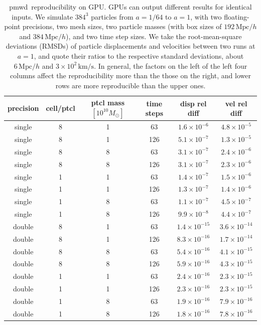\documentclass[modern, dvipsnames]{aastex631}
\newcommand{\pmwd}{{\usefont{T1}{nova}{m}{sl}pmwd}}
\newcommand{\Mpc}{\mathrm{Mpc}}
\begin{document}
\begin{table}[t]
\centering
\caption{\pmwd\ reproducibility on GPU.
GPUs can output different results for identical inputs.
We simulate $384^3$ particles from $a=1/64$ to $a=1$, with two
floating-point precisions, two mesh sizes, two particle masses (with box
sizes of $192 \, \Mpc / h$ and $384 \, \Mpc / h$), and two time step
sizes.
We take the root-mean-square deviations (RMSDs) of particle
displacements and velocities between two runs at $a=1$, and quote their
ratios to the respective standard deviations, about $6 \, \Mpc / h$ and
$3\times10^2 \, \mathrm{km} / \mathrm{s}$.
In general, the factors on the left of the left four columns affect the
reproducibility more than the those on the right, and lower rows are
more reproducible than the upper ones.
}
\label{tab:rep}
\begin{tabular}{cccccc}
  \toprule
  precision & cell/ptcl & ptcl mass $[10^{10} M_\odot]$ & time steps
    & disp rel diff & vel rel diff \\
  \midrule
  single & 8 & 1 &  63 & $1.6\times10^{-6}$  & $4.8\times10^{-5}$  \\
  single & 8 & 1 & 126 & $5.1\times10^{-7}$  & $1.3\times10^{-5}$  \\
  single & 8 & 8 &  63 & $3.1\times10^{-7}$  & $2.4\times10^{-6}$  \\
  single & 8 & 8 & 126 & $3.1\times10^{-7}$  & $2.3\times10^{-6}$  \\
  single & 1 & 1 &  63 & $1.4\times10^{-7}$  & $1.5\times10^{-6}$  \\
  single & 1 & 1 & 126 & $1.3\times10^{-7}$  & $1.4\times10^{-6}$  \\
  single & 1 & 8 &  63 & $1.1\times10^{-7}$  & $4.5\times10^{-7}$  \\
  single & 1 & 8 & 126 & $9.9\times10^{-8}$  & $4.4\times10^{-7}$  \\
  double & 8 & 1 &  63 & $1.4\times10^{-15}$ & $3.6\times10^{-14}$ \\
  double & 8 & 1 & 126 & $8.3\times10^{-16}$ & $1.7\times10^{-14}$ \\
  double & 8 & 8 &  63 & $5.4\times10^{-16}$ & $4.1\times10^{-15}$ \\
  double & 8 & 8 & 126 & $5.9\times10^{-16}$ & $4.3\times10^{-15}$ \\
  double & 1 & 1 &  63 & $2.4\times10^{-16}$ & $2.3\times10^{-15}$ \\
  double & 1 & 1 & 126 & $2.3\times10^{-16}$ & $2.3\times10^{-15}$ \\
  double & 1 & 8 &  63 & $1.9\times10^{-16}$ & $7.9\times10^{-16}$ \\
  double & 1 & 8 & 126 & $1.8\times10^{-16}$ & $7.8\times10^{-16}$ \\
  \bottomrule
\end{tabular}
\end{table}
\end{document}
